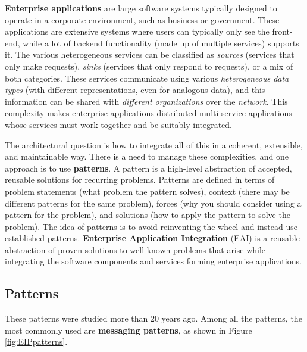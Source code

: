 \textbf{Enterprise applications} are large software systems typically designed to operate in a corporate environment, such as business or government. These applications are extensive systems where users can typically only see the front-end, while a lot of backend functionality (made up of multiple services) supports it. The various heterogeneous services can be classified as \emph{sources} (services that only make requests), \emph{sinks} (services that only respond to requests), or a mix of both categories. These services communicate using various \emph{heterogeneous data types} (with different representations, even for analogous data), and this information can be shared with \emph{different organizations} over the \emph{network}. This complexity makes enterprise applications distributed multi-service applications whose services must work together and be suitably integrated.

The architectural question is how to integrate all of this in a coherent, extensible, and maintainable way. There is a need to manage these complexities, and one approach is to use \textbf{patterns}. A pattern is a high-level abstraction of accepted, reusable solutions for recurring problems. Patterns are defined in terms of problem statements (what problem the pattern solves), context (there may be different patterns for the same problem), forces (why you should consider using a pattern for the problem), and solutions (how to apply the pattern to solve the problem). The idea of patterns is to avoid reinventing the wheel and instead use established patterns. \textbf{Enterprise Application Integration} (EAI) is a reusable abstraction of proven solutions to well-known problems that arise while integrating the software components and services forming enterprise applications. 

\subsection{Patterns}

These patterns were studied more than 20 years ago. Among all the patterns, the most commonly used are \textbf{messaging patterns}, as shown in Figure \ref{fig:EIPpatterns}.

